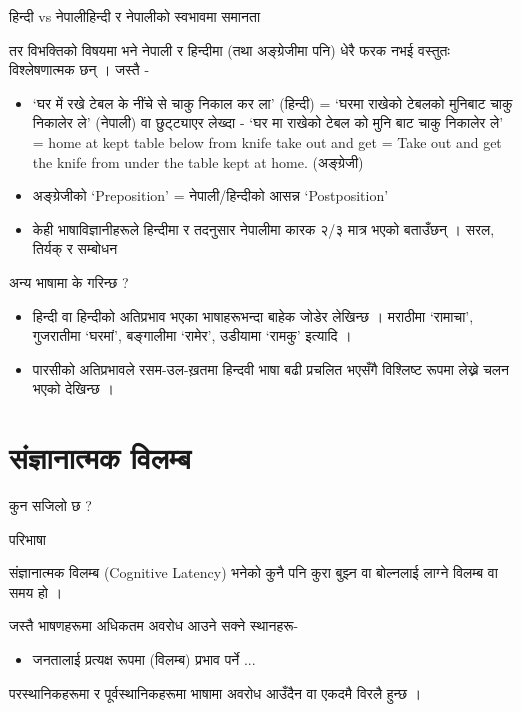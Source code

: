 \documentclass[aspectratio=169, 12pt]{beamer}
\begin{document}
\begin{frame}[fragile]{हिन्दी vs नेपाली}{हिन्दी र नेपालीको स्वभावमा समानता}

तर विभक्तिको विषयमा भने नेपाली र हिन्दीमा (तथा अङ्ग्रेजीमा पनि) धेरै फरक नभई वस्तुतः विश्लेषणात्मक छन् । जस्तै -

\begin{itemize}
\item `घर में रखे टेबल के नींचे से चाकु निकाल कर ला' (हिन्दी) = `घरमा राखेको टेबलको मुनिबाट चाकु निकालेर ले' (नेपाली) वा छुट्ट्याएर लेख्दा - `घर मा राखेको टेबल को मुनि बाट चाकु निकालेर ले' = home at kept table below from knife take out and get = Take out and get the knife from under the table kept at home. (अङ्ग्रेजी)


\item अङ्ग्रेजीको `Preposition' ‍=  नेपाली/हिन्दीको आसन्न `Postposition'


\item केही भाषाविज्ञानीहरूले हिन्दीमा र तदनुसार नेपालीमा कारक २/३ मात्र भएको बताउँछन् । सरल, तिर्यक् र सम्बोधन


\end{itemize}
\end{frame}

\begin{frame}[fragile]{अन्य भाषामा के गरिन्छ ?}{}

\begin{itemize}
\item हिन्दी वा हिन्दीको अतिप्रभाव भएका भाषाहरूभन्दा बाहेक जोडेर लेखिन्छ । मराठीमा `रामाचा', गुजरातीमा `घरमां', बङ्गालीमा `रामेर', उडीयामा `रामकु' इत्यादि ।


\item पारसीको अतिप्रभावले रसम-उल-ख़तमा हिन्दवी भाषा बढी प्रचलित भएसँगै विश्लिष्ट रूपमा लेख्ने चलन भएको देखिन्छ ।


\end{itemize}
\end{frame}

\section{संज्ञानात्मक विलम्ब}

\begin{frame}[fragile]{कुन सजिलो छ ?}{}

\begin{alertblock}{परिभाषा}

संज्ञानात्मक विलम्ब (Cognitive Latency) भनेको कुनै पनि कुरा बुझ्न वा बोल्नलाई लाग्ने विलम्ब वा समय हो ।

\end{alertblock}

जस्तै भाषणहरूमा अधिकतम अवरोध आउने सक्ने स्थानहरू-

\begin{itemize}
\item जनतालाई प्रत्यक्ष रूपमा (विलम्ब) प्रभाव पर्ने ...


\end{itemize}
परस्थानिकहरूमा र पूर्वस्थानिकहरूमा भाषामा अवरोध आउँदैन वा एकदमै विरलै हुन्छ ।

\end{frame}
\end{document}
